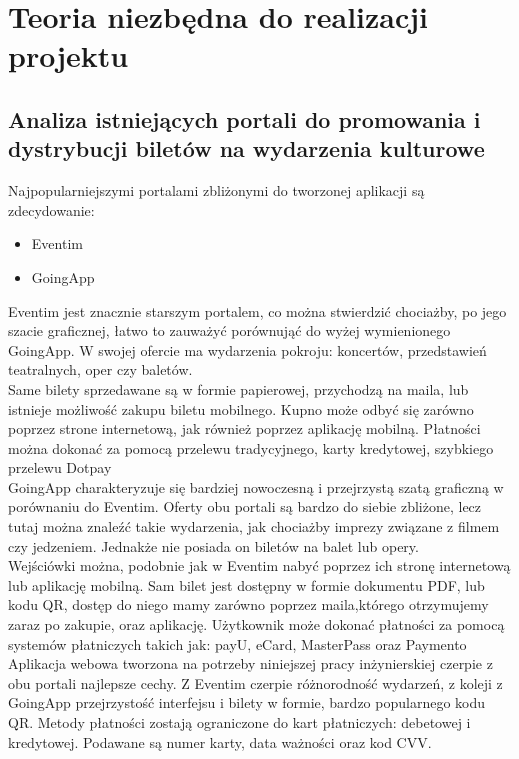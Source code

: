 \documentclass[12pt]{article}
\begin{document}
\begin{sloppypar}
\section{Teoria niezbędna do realizacji projektu}
{
  \subsection{Analiza istniejących portali do promowania i dystrybucji biletów na wydarzenia kulturowe}
  {
    Najpopularniejszymi portalami zbliżonymi do tworzonej aplikacji są zdecydowanie:
    \begin{itemize}
      \item Eventim
      \item GoingApp
    \end{itemize}
    Eventim jest znacznie starszym portalem, co można stwierdzić chociażby, po jego szacie graficznej,
    łatwo to zauważyć porównująć do wyżej wymienionego GoingApp. 
    W swojej ofercie ma wydarzenia pokroju: koncertów, przedstawień teatralnych, oper czy baletów.\\
    Same bilety sprzedawane są w formie papierowej, przychodzą na maila, 
    lub istnieje możliwość zakupu biletu mobilnego. Kupno może odbyć się zarówno poprzez strone internetową, 
    jak również poprzez aplikację mobilną. Płatności można dokonać za pomocą przelewu tradycyjnego, karty kredytowej, szybkiego przelewu Dotpay\\
    GoingApp charakteryzuje się bardziej nowoczesną i przejrzystą szatą graficzną w porównaniu do Eventim. 
    Oferty obu portali są bardzo do siebie zbliżone, lecz tutaj można znaleźć takie wydarzenia, jak chociażby imprezy związane z filmem czy jedzeniem.
    Jednakże nie posiada on biletów na balet lub opery.\\
    Wejściówki można, podobnie jak w Eventim nabyć poprzez ich stronę internetową lub aplikację mobilną. 
    Sam bilet jest dostępny w formie dokumentu PDF, lub kodu QR, dostęp do niego mamy zarówno poprzez maila,którego otrzymujemy zaraz po zakupie, oraz aplikację.
    Użytkownik może dokonać płatności za pomocą systemów płatniczych takich jak: payU, eCard, MasterPass oraz Paymento\textregistered \\
    Aplikacja webowa tworzona na potrzeby niniejszej pracy inżynierskiej czerpie z obu portali najlepsze cechy. 
    Z Eventim czerpie różnorodność wydarzeń, z koleji z GoingApp przejrzystość interfejsu i bilety w formie, bardzo popularnego kodu QR.
    Metody płatności zostają ograniczone do kart płatniczych: debetowej i kredytowej. Podawane są numer karty, data ważności oraz kod CVV.
  }
}
\end{sloppypar}
\end{document}
